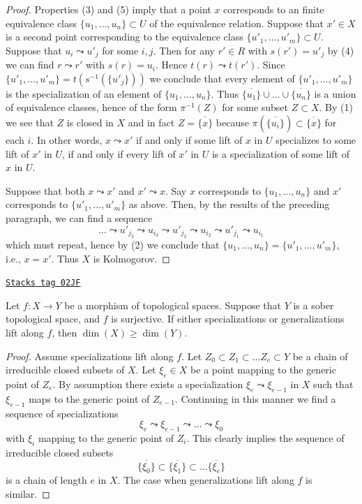 \begin{proof}
Properties (3) and (5) imply that a point $x$ corresponds to an
finite equivalence class $\{u_1, \ldots, u_n\} \subset U$ of the equivalence
relation. Suppose that $x' \in X$ is a second point corresponding to
the equivalence class $\{u'_1, \ldots, u'_m\} \subset U$.
Suppose that $u_i \leadsto u'_j$ for some $i, j$. Then for any
$r' \in R$ with $s(r') = u'_j$ by (4) we can find $r \leadsto r'$
with $s(r) = u_i$. Hence $t(r) \leadsto t(r')$. Since
$\{u'_1, \ldots, u'_m\} = t(s^{-1}(\{u'_j\}))$ we conclude that
every element of $\{u'_1, \ldots, u'_m\}$ is the specialization of
an element of $\{u_1, \ldots, u_n\}$.
Thus $\overline{\{u_1\}} \cup \ldots \cup \overline{\{u_n\}}$ is
a union of equivalence classes, hence of the form $\pi^{-1}(Z)$
for some subset $Z \subset X$. By (1) we see that $Z$ is closed in $X$
and in fact $Z = \overline{\{x\}}$ because $\pi(\overline{\{u_i\}})
\subset \overline{\{x\}}$ for each $i$. In other words, $x \leadsto x'$
if and only if some lift of $x$ in $U$ specializes to some lift of
$x'$ in $U$, if and only if every lift of $x'$ in $U$ is a specialization
of some lift of $x$ in $U$.

\medskip\noindent
Suppose that both $x \leadsto x'$ and $x' \leadsto x$. Say $x$ corresponds
to $\{u_1, \ldots, u_n\}$ and $x'$ corresponds to $\{u'_1, \ldots, u'_m\}$
as above. Then, by the results of the preceding paragraph, we can find a
sequence
$$
\ldots \leadsto u'_{j_3} \leadsto u_{i_3} \leadsto u'_{j_2} \leadsto
u_{i_2} \leadsto u'_{j_1} \leadsto u_{i_1}
$$
which must repeat, hence by (2) we conclude that
$\{u_1, \ldots, u_n\} = \{u'_1, \ldots, u'_m\}$, i.e., $x = x'$.
Thus $X$ is Kolmogorov.
\end{proof}


\begin{lemma}
\label{topology-lemma-dimension-specializations-lift}
\href{https://stacks.math.columbia.edu/tag/02JF}{\texttt{Stacks tag 02JF}}

Let $f : X \to Y$ be a morphism of topological spaces.
Suppose that $Y$ is a sober topological space, and $f$ is surjective.
If either specializations or generalizations lift along $f$, then
$\dim(X) \geq \dim(Y)$.
\end{lemma}

\begin{proof}
Assume specializations lift along $f$.
Let $Z_0 \subset Z_1 \subset \ldots Z_e \subset Y$ be a chain
of irreducible closed subsets of $X$. Let $\xi_e \in X$ be a point
mapping to the generic point of $Z_e$. By assumption there
exists a specialization
$\xi_e \leadsto \xi_{e - 1}$ in $X$ such that $\xi_{e - 1}$ maps to
the generic point of $Z_{e - 1}$. Continuing in this manner we find
a sequence of specializations
$$
\xi_e \leadsto \xi_{e - 1} \leadsto \ldots \leadsto \xi_0
$$
with $\xi_i$ mapping to the generic point of $Z_i$.
This clearly implies the sequence of irreducible closed
subsets
$$
\overline{\{\xi_0\}} \subset
\overline{\{\xi_1\}} \subset \ldots
\overline{\{\xi_e\}}
$$
is a chain of length $e$ in $X$.
The case when generalizations lift along $f$ is similar.
\end{proof}

